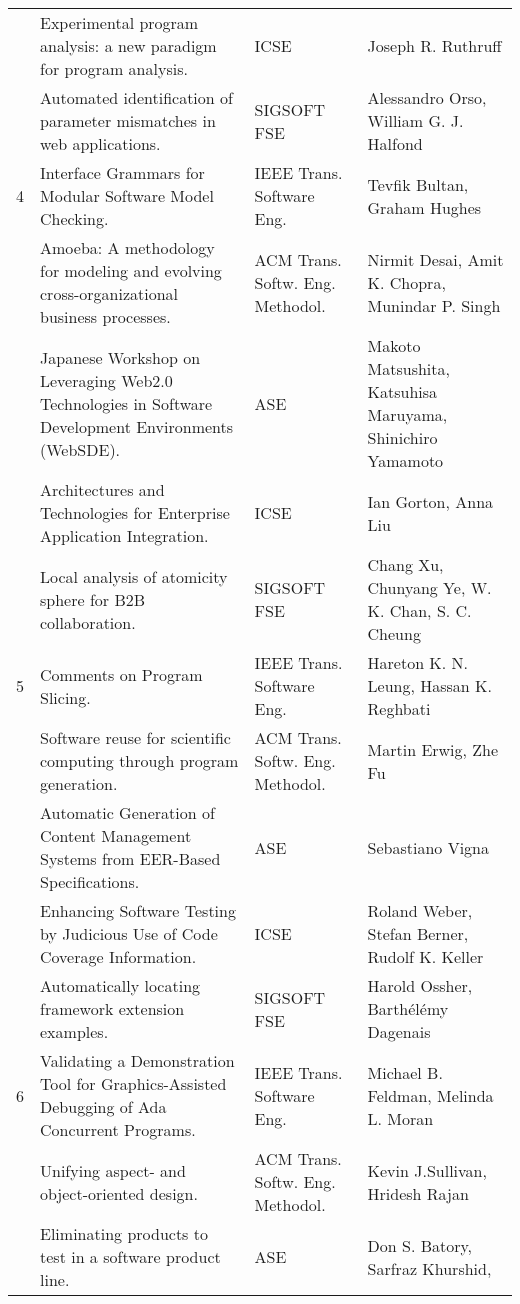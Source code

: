 \begin{center}
\begin{longtable}{|p{}p{}p{}p{}|}
 & Experimental program analysis: a new paradigm for program analysis.& ICSE& Joseph R. Ruthruff \\
\rowcolor{black!20} & Automated identification of parameter mismatches in web applications.& SIGSOFT 
FSE& Alessandro Orso, William G. J. Halfond \\
4 & Interface Grammars for Modular Software Model Checking.& IEEE Trans. Software Eng.& Tevfik 
Bultan, Graham Hughes \\
\rowcolor{black!20} & Amoeba: A methodology for modeling and evolving cross-organizational business 
processes.& ACM Trans. Softw. Eng. Methodol.& Nirmit Desai, Amit K. Chopra, Munindar P. Singh \\
 & Japanese Workshop on Leveraging Web2.0 Technologies in Software Development Environments 
(WebSDE).& ASE& Makoto Matsushita, Katsuhisa Maruyama, Shinichiro Yamamoto \\
\rowcolor{black!20} & Architectures and Technologies for Enterprise Application Integration.& ICSE& 
Ian Gorton, Anna Liu \\
 & Local analysis of atomicity sphere for B2B collaboration.& SIGSOFT FSE& Chang Xu, Chunyang Ye, W. 
K. Chan, S. C. Cheung \\
\rowcolor{black!20} 5 & Comments on Program Slicing.& IEEE Trans. Software Eng.& Hareton K. N. 
Leung, Hassan K. Reghbati \\
 & Software reuse for scientific computing through program generation.& ACM Trans. Softw. Eng. 
Methodol.& Martin Erwig, Zhe Fu \\
\rowcolor{black!20} & Automatic Generation of Content Management Systems from EER-Based 
Specifications.& ASE& Sebastiano Vigna \\
 & Enhancing Software Testing by Judicious Use of Code Coverage Information.& ICSE& Roland Weber, 
Stefan Berner, Rudolf K. Keller \\
\rowcolor{black!20} & Automatically locating framework extension examples.& SIGSOFT FSE& Harold 
Ossher, Barthélémy Dagenais \\
6 & Validating a Demonstration Tool for Graphics-Assisted Debugging of Ada Concurrent Programs.& 
IEEE Trans. Software Eng.& Michael B. Feldman, Melinda L. Moran \\
\rowcolor{black!20} & Unifying aspect- and object-oriented design.& ACM Trans. Softw. Eng. 
Methodol.& Kevin J.Sullivan, Hridesh Rajan \\
 & Eliminating products to test in a software product line.& ASE& Don S. Batory, Sarfraz Khurshid, 

\end{longtable}
\end{center}
